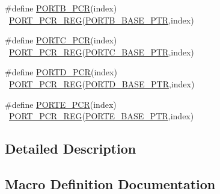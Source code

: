 \begin{DoxyCompactItemize}
\item 
\#define \hyperlink{group___p_o_r_t___register___accessor___macros_ga551c76757a3ebc18de031a5e45bee678}{P\+O\+R\+T\+B\+\_\+\+P\+CR}(index)                                              ~\hyperlink{group___p_o_r_t___register___accessor___macros_gac6f8c9eab2e63700616f4d4fa4a6ef0e}{P\+O\+R\+T\+\_\+\+P\+C\+R\+\_\+\+R\+EG}(\hyperlink{group___p_o_r_t___peripheral_ga585b4782d1ceb44492289af0019480f9}{P\+O\+R\+T\+B\+\_\+\+B\+A\+S\+E\+\_\+\+P\+TR},index)
\item 
\#define \hyperlink{group___p_o_r_t___register___accessor___macros_ga7eac1367167d119a0388f82fe7f8dd44}{P\+O\+R\+T\+C\+\_\+\+P\+CR}(index)                                              ~\hyperlink{group___p_o_r_t___register___accessor___macros_gac6f8c9eab2e63700616f4d4fa4a6ef0e}{P\+O\+R\+T\+\_\+\+P\+C\+R\+\_\+\+R\+EG}(\hyperlink{group___p_o_r_t___peripheral_ga03c740cdda17711afafc932723871474}{P\+O\+R\+T\+C\+\_\+\+B\+A\+S\+E\+\_\+\+P\+TR},index)
\item 
\#define \hyperlink{group___p_o_r_t___register___accessor___macros_gac2a3e9731320fb291256347dfee6d6c5}{P\+O\+R\+T\+D\+\_\+\+P\+CR}(index)                                              ~\hyperlink{group___p_o_r_t___register___accessor___macros_gac6f8c9eab2e63700616f4d4fa4a6ef0e}{P\+O\+R\+T\+\_\+\+P\+C\+R\+\_\+\+R\+EG}(\hyperlink{group___p_o_r_t___peripheral_ga7f5a263751543810ebfdbde278383276}{P\+O\+R\+T\+D\+\_\+\+B\+A\+S\+E\+\_\+\+P\+TR},index)
\item 
\#define \hyperlink{group___p_o_r_t___register___accessor___macros_ga34d5c13bac091141ec60f381569ea24d}{P\+O\+R\+T\+E\+\_\+\+P\+CR}(index)                                              ~\hyperlink{group___p_o_r_t___register___accessor___macros_gac6f8c9eab2e63700616f4d4fa4a6ef0e}{P\+O\+R\+T\+\_\+\+P\+C\+R\+\_\+\+R\+EG}(\hyperlink{group___p_o_r_t___peripheral_gab166fe285bbb15b52de610f408fe25d3}{P\+O\+R\+T\+E\+\_\+\+B\+A\+S\+E\+\_\+\+P\+TR},index)
\end{DoxyCompactItemize}


\subsection{Detailed Description}


\subsection{Macro Definition Documentation}

